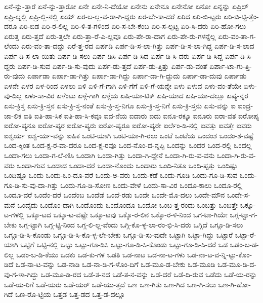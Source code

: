 {ಏನೆ-ನ್ನು-ತ್ತಾರೆ
ಏನೆ-ನ್ನು-ತ್ತಾರೋ
ಏನೇ
ಏನೇ-ನಿ-ದೆಯೋ
ಏನೇನು
ಏನೇನೂ
ಏನೇನೋ
ಏನೋ
ಏನ್ನನ್ನು
ಏಪ್ರಿಲ್
ಏಪ್ರಿ-ಲ್ನಲ್ಲಿ
ಏಪ್ರಿ-ಲ್ಲಿ-ನಲ್ಲಿ
ಏಯ್
ಏರ-ಬ-ಲ್ಲ-ವ-ರಾ-ಗಿ-ದ್ದರು
ಏರ-ಬೇ-ಕಾ-ದರೆ
ಏರಿದ
ಏರಿ-ಬಿ-ಟ್ಟರು
ಏರಿ-ಬಿ-ಟ್ಟಿ-ತ್ತೆಂ-ದರೂ
ಏರಿ-ಬಿಡ
ಏರಿ-ರ-ಲಿಲ್ಲ
ಏರಿ-ಳಿ-ತ-ಗಳಿಂದ
ಏರಿ-ಸ-ಬೇ-ಕೆಂಬ
ಏರಿ-ಸ-ಲ್ಪಟ್ಟ
ಏರಿ-ಸಿ-ದರು
ಏರಿ-ಹೋ-ಗಲು
ಏರುತ್ತ
ಏರು-ತ್ತದೆ
ಏರು-ತ್ತಲೇ
ಏರು-ತ್ತಾ-ರೆ-ಎ-ಲ್ಲವೂ
ಏರು-ಪೇ-ರಾ-ದಾಗ
ಏರು-ಪೇ-ರು-ಗಳನ್ನೆಲ್ಲ
ಏರು-ವಂ-ತಾ-ಗ-ಲೆಂದು
ಏರು-ವಂ-ತಾ-ದದ್ದು
ಏರೆ-ತ್ತ-ರದ
ಏರ್ಪಡಿ
ಏರ್ಪ-ಡಿ-ಸ-ಲಾ-ಗಿತ್ತು
ಏರ್ಪ-ಡಿ-ಸ-ಲಾ-ಗಿದ್ದ
ಏರ್ಪ-ಡಿ-ಸ-ಲಾದ
ಏರ್ಪ-ಡಿ-ಸ-ಲಾ-ಯಿತು
ಏರ್ಪ-ಡಿ-ಸಲು
ಏರ್ಪ-ಡಿಸಿ
ಏರ್ಪ-ಡಿ-ಸಿದ
ಏರ್ಪ-ಡಿ-ಸಿ-ದರು
ಏರ್ಪ-ಡಿ-ಸಿದ್ದ
ಏರ್ಪ-ಡಿ-ಸಿ-ದ್ದರು
ಏರ್ಪ-ಡಿ-ಸುವ
ಏರ್ಪ-ಡಿ-ಸು-ವುದು
ಏರ್ಪ-ಡು-ತ್ತದೆ
ಏರ್ಪ-ಡು-ತ್ತಿತ್ತು
ಏರ್ಪ-ಡು-ವಂತೆ
ಏರ್ಪಾ-ಟಾ-ಗು-ತ್ತಿ-ರು-ವುದು
ಏರ್ಪಾಡಾ
ಏರ್ಪಾ-ಡಾ-ಗಿತ್ತು
ಏರ್ಪಾ-ಡಾ-ಗಿದ್ದು
ಏರ್ಪಾ-ಡಾ-ಗಿ-ದ್ದುದು
ಏರ್ಪಾ-ಡಾ-ದುವು
ಏರ್ಪಾಡು
ಏಳನೇ
ಏಳರ
ಏಳ-ರಿಂದ
ಏಳಲು
ಏಳಿ
ಏಳಿ-ಗೆ-ಗಾಗಿ
ಏಳಿ-ಗೆಗೆ
ಏಳಿ-ಗೆ-ಯನ್ನೇ
ಏಳು
ಏಳುವ
ಏಳು-ವಂ-ತೆಯೇ
ಏಳು-ವು-ದಿಲ್ಲ
ಏಳು-ಸಾ-ವಿರ
ಏಳೆಂಟು
ಏಳ್ಗೆ-ಗಾಗಿ
ಏಳ್ಗೆಯ
ಏಷಿ-ಯಾ-ಟಿಕ್
ಏಷಿ-ಯಾದ
ಏಷಿ-ಯಾ-ದಲ್ಲೂ
ಏಷ್ಯ-ನ್ನರ
ಏಸು-ಕ್ರಿಸ್ತ
ಏಸು-ಕ್ರಿ-ಸ್ತನ
ಏಸು-ಕ್ರಿ-ಸ್ತ-ನಂತೆ
ಏಸು-ಕ್ರಿ-ಸ್ತ-ನಿಗೂ
ಏಸು-ಕ್ರಿ-ಸ್ತ-ನಿಗೆ
ಏಸು-ಕ್ರಿ-ಸ್ತನು
ಏಸು-ವನ್ನು
ಐ
ಐಂದ್ರ-ಜಾ-ಲಿಕ
ಐತಿ
ಐತಿ-ಹಾ-ಸಿಕ
ಐತಿ-ಹಾ-ಸಿ-ಕವೂ
ಐದ-ನೆಯ
ಐದಾರು
ಐದು
ಐನೂ-ರಕ್ಕೂ
ಐನೂರು
ಐರಾ-ವತ
ಐರೋಪ್ಯ
ಐರೋ-ಪ್ಯನೂ
ಐರೋ-ಪ್ಯರ
ಐರೋ-ಪ್ಯರು
ಐರೋ-ಪ್ಯರೂ
ಐರೋ-ಪ್ಯರೇ
ಐರ್ಲೆಂ-ಡಿ-ನಲ್ಲಿ
ಐವತ್ತು
ಐವತ್ತೇ
ಐವರು
ಐಶ್ವರ್ಯ
ಐಶ್ವ-ರ್ಯ-ವನ್ನು
ಐಹಿಕ
ಒಂಟಿ-ಯಾಗಿ
ಒಂಟಿ-ಯಾ-ಗಿ-ರಲು
ಒಂಟೆ
ಒಂಟೆಯ
ಒಂದಂಶ
ಒಂದಂ-ಶ-ವಷ್ಟೆ
ಒಂದ-ಕ್ಕಿಂತ
ಒಂದ-ಕ್ಷ-ರ-ವಾ-ದರೂ
ಒಂದ-ಕ್ಷ-ರವೂ
ಒಂದ-ನೊಂ-ದ-ನ್ನಪ್ಪಿ
ಒಂದನ್ನು
ಒಂದರ
ಒಂದ-ರಲ್ಲಿ
ಒಂದಲ್ಲ
ಒಂದಾ-ಗಲು
ಒಂದಾ-ಗ-ಲೆ-ಣಿಸಿ
ಒಂದಾಗಿ
ಒಂದಾ-ಗಿತ್ತು
ಒಂದಾ-ಗಿ-ದ್ದೇನೆ
ಒಂದಾ-ಗಿ-ರು-ವ-ವನು
ಒಂದಾ-ಗಿ-ರು-ವ-ವರು
ಒಂದಾ-ಗುವ
ಒಂದಾದ
ಒಂದಾ-ದರೆ
ಒಂದಾ-ನೊಂದು
ಒಂದಾರು
ಒಂದಿ-ನಿತೂ
ಒಂದಿ-ಪ್ಪತ್ತು
ಒಂದಿಷ್ಟು
ಒಂದಿಷ್ಟೂ
ಒಂದು
ಒಂದು-ಒಂ-ದೂ-ವರೆ
ಒಂದು-ಅ-ವರು
ಒಂದು-ಕಡೆ
ಒಂದು-ಗೂಡಿ
ಒಂದು-ಗೂ-ಡಿ-ಸುವ
ಒಂದು-ಗೂ-ಡಿ-ಸು-ವು-ದಾ-ಗಿತ್ತು
ಒಂದು-ಗೂ-ಡಿ-ಸೋಣ
ಒಂದು-ವೇಳೆ
ಒಂದು-ಸಾ-ವಿರ
ಒಂದೂ-ಕಾಲು
ಒಂದೂ-ರಲ್ಲಿ
ಒಂದೂ-ವರೆ
ಒಂದೆಂ-ದರೆ
ಒಂದೆಂಬ
ಒಂದೆಡೆ
ಒಂದೆ-ರಡು
ಒಂದೇ
ಒಂದೇ-ಮೊ-ದಲು
ಒಂದೇ-ಮೌನ
ಒಂದೇ-ಸ-ಮನೆ
ಒಂದೈದು
ಒಂದೊಂ-ದಾಗಿ
ಒಂದೊಂದು
ಒಂದೊಂದೂ
ಒಂದೋ
ಒಂಬ-ತ್ತ-ರಂದು
ಒಂಬತ್ತು
ಒಂಬತ್ತೇ
ಒಕ್ಕೂ-ಟ-ಗಳಲ್ಲಿ
ಒಕ್ಕೂ-ಟದ
ಒಕ್ಕೂ-ಟ-ವಷ್ಟೇ
ಒಕ್ಕೂ-ಟವು
ಒಕ್ಕೊ-ರ-ಲಿನ
ಒಕ್ಕೊ-ರ-ಳಿ-ನಿಂದ
ಒಗ-ಟಾ-ಗಿಯೇ
ಒಗ್ಗ-ಟ್ಟಾ-ಗ-ಬೇಕು
ಒಗ್ಗ-ಟ್ಟಾಗಿ
ಒಗ್ಗ-ಟ್ಟಿ-ನಿಂದ
ಒಗ್ಗ-ಲಿ-ಲ್ಲ-ವೆಂದು
ಒಗ್ಗಿ-ಕೊ-ಳ್ಳ-ಲಾ-ರಂ-ಭಿ-ಸಿ-ದರು
ಒಗ್ಗಿದೆ
ಒಗ್ಗೂ-ಡಿ-ಸಲು
ಒಗ್ಗೂ-ಡಿ-ಸಿ-ಕೊಂಡು
ಒಗ್ಗೂ-ಡಿ-ಸಿ-ಕೊ-ಳ್ಳ-ಲೇ-ಬೇಕು
ಒಗ್ಗೂ-ಡಿ-ಸು-ವುದೇ
ಒಟ್ಟಾಗಿ
ಒಟ್ಟಾ-ಗಿದ್ದು
ಒಟ್ಟಾರೆ
ಒಟ್ಟಾ-ರೆ-ಯಾಗಿ
ಒಟ್ಟಿಗೆ
ಒಟ್ಟಿ-ನಲ್ಲಿ
ಒಟ್ಟು
ಒಟ್ಟು-ಗೂ-ಡಿಸಿ
ಒಟ್ಟು-ಗೂ-ಡಿ-ಸಿ-ಕೊಂಡು
ಒಟ್ಟು-ಗೂ-ಡಿ-ಸಿ-ದರೆ
ಒಡ
ಒಡಂ-ಬ-ಡ-ಲಿಲ್ಲ
ಒಡಂ-ಬ-ಡಿ-ಕೆಯು
ಒಡಕು
ಒಡ-ಕು-ಗಳ
ಒಡತಿ
ಒಡ-ನಾಟ
ಒಡ-ನಾ-ಟ-ಗಳು
ಒಡ-ನಾ-ಟ-ವ-ನ್ನಿ-ಟ್ಟು-ಕೊಂ-ಡಿದೆ
ಒಡ-ನಾ-ಟ-ವನ್ನು
ಒಡ-ನಾಡಿ
ಒಡ-ನಾ-ಡಿ-ಗ-ಳೊಂ-ದಿಗೆ
ಒಡ-ಮೂ-ಡ-ಬೇಕು
ಒಡ-ಮೂಡಿ
ಒಡ-ಮೂ-ಡಿ-ದ-ವು-ಗ-ಳಾ-ಗಿದ್ದು
ಒಡ-ಮೂ-ಡಿ-ರದ
ಒಡೆ-ತ-ನದ
ಒಡೆ-ತ-ನ-ವನ್ನು
ಒಡೆ-ದರೆ
ಒಡೆ-ದಿ-ರುವ
ಒಡೆದು
ಒಡೆ-ಯ-ರನ್ನು
ಒಡೆ-ಯ-ರಿಗೆ
ಒಡೆ-ಯರು
ಒಡೆ-ಯರ್
ಒಡೆ-ಯು-ತ್ತದೆ
ಒಣ
ಒಣ-ಗಿತು
ಒಣ-ಗಿದ
ಒಣ-ಗಿ-ಸಲು
ಒಣ-ಗಿ-ಹೋ-ಗಿದೆ
ಒಣ-ರೊ-ಟ್ಟಿಯ
ಒತ್ತಡ
ಒತ್ತ-ಡದ
ಒತ್ತ-ಡ-ದಲ್ಲೂ
}
